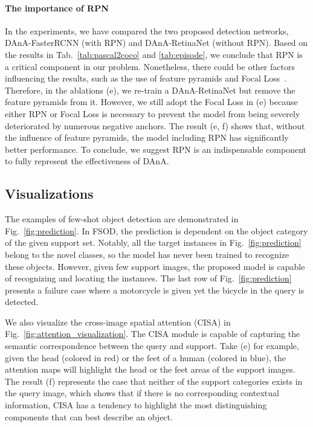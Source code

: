 \documentclass[journal]{IEEEtran}
\begin{document}
\paragraph{The importance of RPN}
In the experiments, we have compared the two proposed detection networks, DAnA-FasterRCNN (with RPN) and DAnA-RetinaNet (without RPN).
Based on the results in Tab.~\ref{tab:pascal2coco} and \ref{tab:episode}, we conclude that RPN is a critical component in our problem.
Nonetheless, there could be other factors influencing the results, such as the use of feature pyramids and Focal Loss~\cite{lin2017focal}.
Therefore, in the ablations (e), we re-train a DAnA-RetinaNet but remove the feature pyramids from it.
However, we still adopt the Focal Loss in (e) because either RPN or Focal Loss is necessary to prevent the model from being severely deteriorated by numerous negative anchors.
The result (e, f) shows that, without the influence of feature pyramids, the model including RPN has significantly better performance.
To conclude, we suggest RPN is an indispensable component to fully represent the effectiveness of DAnA.











\subsection{Visualizations}
The examples of few-shot object detection are demonstrated in Fig.~\ref{fig:prediction}.
In FSOD, the prediction is dependent on the object category of the given support set.
Notably, all the target instances in Fig.~\ref{fig:prediction} belong to the novel classes, so the model has never been trained to recognize these objects.
However, given few support images, the proposed model is capable of recognizing and locating the instances.
The last row of Fig.~\ref{fig:prediction} presents a failure case where a motorcycle is given yet the bicycle in the query is detected.


We also visualize the cross-image spatial attention (CISA) in Fig.~\ref{fig:attention_visualization}.
The CISA module is capable of capturing the semantic correspondence between the query and support.
Take (e) for example, given the head (colored in red) or the feet of a human (colored in blue), the attention maps will highlight the head or the feet areas of the support images.
The result (f) represents the case that neither of the support categories exists in the query image, which shows that if there is no corresponding contextual information, CISA has a tendency to highlight the most distinguishing components that can best describe an object.
\end{document}
